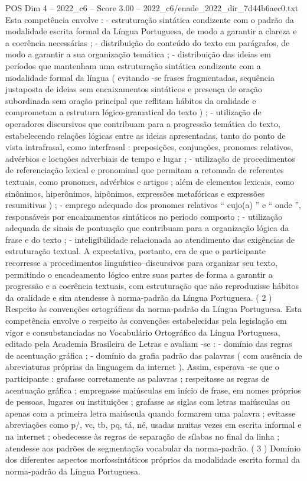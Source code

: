\begin{textsample}{POS Dim 4 – 2022\_c6 – Score 3.00 – 2022\_c6/enade\_2022\_dir\_7d44b6aec0.txt}
Esta competência envolve : - estruturação sintática condizente com o padrão da modalidade escrita formal da Língua Portuguesa, de modo a garantir a clareza e a coerência necessárias ; - distribuição do conteúdo do texto em parágrafos, de modo a garantir a sua organização temática ; - distribuição das ideias em períodos que mantenham uma estruturação sintática condizente com a modalidade formal da língua ( evitando -se frases fragmentadas, sequência justaposta de ideias sem encaixamentos sintáticos e presença de oração subordinada sem oração principal que reflitam hábitos da oralidade e comprometam a estrutura lógico-gramatical do texto ) ; - utilização de operadores discursivos que contribuam para a progressão temática do texto, estabelecendo relações lógicas entre as ideias apresentadas, tanto do ponto de vista intrafrasal, como interfrasal : preposições, conjunções, pronomes relativos, advérbios e locuções adverbiais de tempo e lugar ; - utilização de procedimentos de referenciação lexical e pronominal que permitam a retomada de referentes textuais, como pronomes, advérbios e artigos ; além de elementos lexicais, como sinônimos, hiperônimos, hipônimos, expressões metafóricas e expressões resumitivas ) ; - emprego adequado dos pronomes relativos “ cujo(a) ” e “ onde ”, responsáveis por encaixamentos sintáticos no período composto ; - utilização adequada de sinais de pontuação que contribuam para a organização lógica da frase e do texto ; - inteligibilidade relacionada ao atendimento das exigências de estruturação textual.
A expectativa, portanto, era de que o participante recorresse a procedimentos linguístico–discursivos para organizar seu texto, permitindo o encadeamento lógico entre suas partes de forma a garantir a progressão e a coerência textuais, com estruturação que não reproduzisse hábitos da oralidade e sim atendesse à norma-padrão da Língua Portuguesa. ( 2 ) Respeito às convenções ortográficas da norma-padrão da Língua Portuguesa.
Esta competência envolve o respeito às convenções estabelecidas pela legislação em vigor e consubstanciadas no Vocabulário Ortográfico da Língua Portuguesa, editado pela Academia Brasileira de Letras e avaliam -se : - domínio das regras de acentuação gráfica ; - domínio da grafia padrão das palavras ( com ausência de abreviaturas próprias da linguagem da internet ).
Assim, esperava -se que o participante : grafasse corretamente as palavras ; respeitasse as regras de acentuação gráfica ; empregasse maiúsculas em início de frase, em nomes próprios de pessoas, lugares ou instituições ; grafasse as siglas com letras maiúsculas ou apenas com a primeira letra maiúscula quando formarem uma palavra ; evitasse abreviações como p/, vc, tb, pq, tá, né, usadas muitas vezes em escrita informal e na internet ; obedecesse às regras de separação de sílabas no final da linha ; atendesse aos padrões de segmentação vocabular da norma-padrão. ( 3 ) Domínio dos diferentes aspectos morfossintáticos próprios da modalidade escrita formal da norma-padrão da Língua Portuguesa.

\end{textsample}
